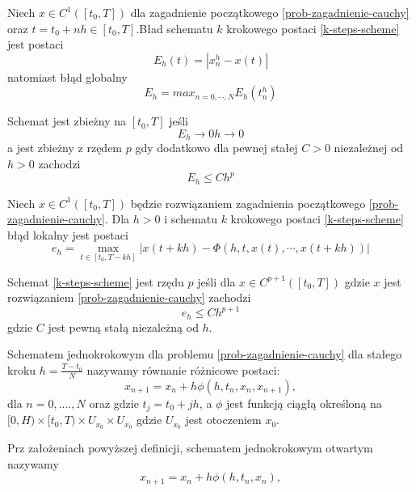 \documentclass[12pt,a4paper]{report}
\begin{document}
\begin{definition} 
Niech $ x \in C^{1}([t_0,T])$ dla zagadnienie początkowego \ref{prob-zagadnienie-cauchy} oraz $t=t_0 +nh \in [t_0,T]$.Bład schematu $k$ krokowego postaci \ref{k-steps-scheme} jest postaci 
$$
E_h(t) = |x^{h}_{n} - x(t)|
$$ 
natomiast błąd globalny 
$$
E_h = max_{n=0,\cdots,N} E_h(t^{h}_{n})
$$
\end{definition}
\begin{definition}
Schemat jest zbieżny na $[t_0,T]$ jeśli 
$$
E_h \to 0  h \to 0
$$
a jest zbieżny z rzędem $p$ gdy dodatkowo dla pewnej stałej $C>0$ niezależnej od $h>0$ zachodzi 
$$
E_h \leq C h^p
$$
\end{definition}
\begin{definition}
Niech $x \in C^1([t_0,T]) $ będzie rozwiązaniem zagadnienia początkowego \ref{prob-zagadnienie-cauchy}. Dla $h>0$ i schematu $k$ krokowego postaci \ref{k-steps-scheme} błąd lokalny jest postaci
\begin{equation}
e_h = \max_{t \in [t_0,T-kh]} |x(t + kh) - \Phi (h,t,x(t),\cdots, x(t + kh))|
\end{equation}
\end{definition}
\begin{definition} 
Schemat \ref{k-steps-scheme} jest rzędu $p$ jeśli dla $x \in C^{p+1}([t_0,T])$ gdzie $x$ jest rozwiązaniem \ref{prob-zagadnienie-cauchy} zachodzi
$$
e_h \leq C h^{p+1}
$$
gdzie $C$ jest pewną stałą niezależną od $h$. 
\end{definition}
\begin{definition} 
Schematem jednokrokowym dla problemu \ref{prob-zagadnienie-cauchy} dla stałego kroku $h = \frac{T-t_0}{N}$ nazywamy równanie różnicowe postaci:
$$
x_{n+1} = x_n + h \phi(h,t_{n},x_{n},x_{n+1}),  
$$
dla $n = 0,....,N$ oraz gdzie $t_{j} = t_{0} + jh$, a $\phi$ jest funkcją ciągłą określoną na $[0,H) \times [t_0,T) \times U_{x_0} \times U_{x_0} $ gdzie $ U_{x_0} $ jest otoczeniem $x_0$.   
\end{definition}
\begin{definition}
Prz założeniach powyższej definicji, schematem jednokrokowym otwartym nazywamy 
$$
x_{n+1} = x_n + h \phi(h,t_{n},x_{n}),  
$$
\end{definition}
 
\end{document}
